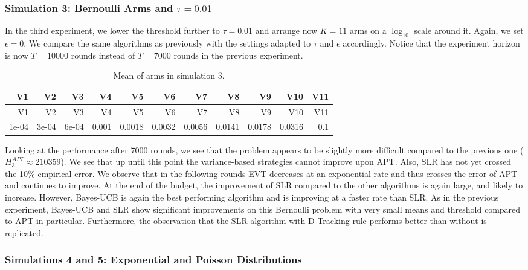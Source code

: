 \documentclass[11pt,]{article}
\begin{document}
\subsubsection{\texorpdfstring{Simulation 3: Bernoulli Arms and
\(\tau = 0.01\)}{Simulation 3: Bernoulli Arms and \textbackslash{}tau = 0.01}}\label{simulation-3-bernoulli-arms-and-tau-0.01}

In the third experiment, we lower the threshold further to
\(\tau = 0.01\) and arrange now \(K=11\) arms on a \(\log_{10}\) scale
around it. Again, we set \(\epsilon = 0\). We compare the same
algorithms as previously with the settings adapted to \(\tau\) and
\(\epsilon\) accordingly. Notice that the experiment horizon is now
\(T=10000\) rounds instead of \(T=7000\) rounds in the previous
experiment.

\begin{longtable}[]{@{}rrrrrrrrrrr@{}}
\caption{Mean of arms in simulation 3.}\tabularnewline
\toprule
V1 & V2 & V3 & V4 & V5 & V6 & V7 & V8 & V9 & V10 & V11\tabularnewline
\midrule
\endfirsthead
\toprule
V1 & V2 & V3 & V4 & V5 & V6 & V7 & V8 & V9 & V10 & V11\tabularnewline
\midrule
\endhead
1e-04 & 3e-04 & 6e-04 & 0.001 & 0.0018 & 0.0032 & 0.0056 & 0.0141 &
0.0178 & 0.0316 & 0.1\tabularnewline
\bottomrule
\end{longtable}

Looking at the performance after 7000 rounds, we see that the problem
appears to be slightly more difficult compared to the previous one
(\(H_3^{APT} \approx 210359\)). We see that up until this point the
variance-based strategies cannot improve upon APT. Also, SLR has not yet
crossed the 10\% empirical error. We observe that in the following
rounds EVT decreases at an exponential rate and thus crosses the error
of APT and continues to improve. At the end of the budget, the
improvement of SLR compared to the other algorithms is again large, and
likely to increase. However, Bayes-UCB is again the best performing
algorithm and is improving at a faster rate than SLR. As in the previous
experiment, Bayes-UCB and SLR show significant improvements on this
Bernoulli problem with very small means and threshold compared to APT in
particular. Furthermore, the observation that the SLR algorithm with
D-Tracking rule performs better than without is replicated.

\subsubsection{Simulations 4 and 5: Exponential and Poisson
Distributions}\label{simulations-4-and-5-exponential-and-poisson-distributions}
\end{document}
